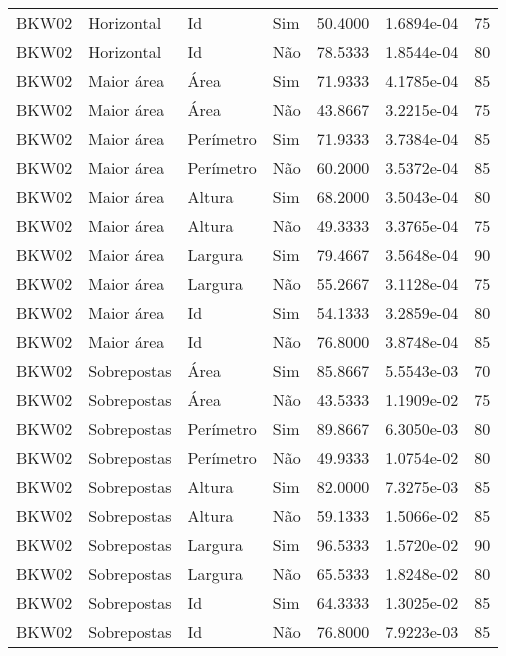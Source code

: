 \begin{tabular}{llllrrr}
    BKW02     & Horizontal  & Id        & Sim         & 50.4000      & 1.6894e-04 & 75       \\
    BKW02     & Horizontal  & Id        & Não         & 78.5333      & 1.8544e-04 & 80       \\
    BKW02     & Maior área  & Área      & Sim         & 71.9333      & 4.1785e-04 & 85       \\
    BKW02     & Maior área  & Área      & Não         & 43.8667      & 3.2215e-04 & 75       \\
    BKW02     & Maior área  & Perímetro & Sim         & 71.9333      & 3.7384e-04 & 85       \\
    BKW02     & Maior área  & Perímetro & Não         & 60.2000      & 3.5372e-04 & 85       \\
    BKW02     & Maior área  & Altura    & Sim         & 68.2000      & 3.5043e-04 & 80       \\
    BKW02     & Maior área  & Altura    & Não         & 49.3333      & 3.3765e-04 & 75       \\
    BKW02     & Maior área  & Largura   & Sim         & 79.4667      & 3.5648e-04 & 90       \\
    BKW02     & Maior área  & Largura   & Não         & 55.2667      & 3.1128e-04 & 75       \\
    BKW02     & Maior área  & Id        & Sim         & 54.1333      & 3.2859e-04 & 80       \\
    BKW02     & Maior área  & Id        & Não         & 76.8000      & 3.8748e-04 & 85       \\
    BKW02     & Sobrepostas & Área      & Sim         & 85.8667      & 5.5543e-03 & 70       \\
    BKW02     & Sobrepostas & Área      & Não         & 43.5333      & 1.1909e-02 & 75       \\
    BKW02     & Sobrepostas & Perímetro & Sim         & 89.8667      & 6.3050e-03 & 80       \\
    BKW02     & Sobrepostas & Perímetro & Não         & 49.9333      & 1.0754e-02 & 80       \\
    BKW02     & Sobrepostas & Altura    & Sim         & 82.0000      & 7.3275e-03 & 85       \\
    BKW02     & Sobrepostas & Altura    & Não         & 59.1333      & 1.5066e-02 & 85       \\
    BKW02     & Sobrepostas & Largura   & Sim         & 96.5333      & 1.5720e-02 & 90       \\
    BKW02     & Sobrepostas & Largura   & Não         & 65.5333      & 1.8248e-02 & 80       \\
    BKW02     & Sobrepostas & Id        & Sim         & 64.3333      & 1.3025e-02 & 85       \\
    BKW02     & Sobrepostas & Id        & Não         & 76.8000      & 7.9223e-03 & 85       \\
    \hline
\end{tabular}